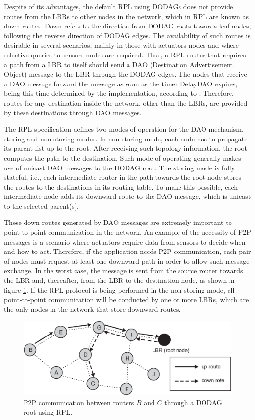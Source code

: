 \documentclass[authoryear,preprint,review,12pt]{elsarticle}
\begin{document}
Despite of its advantages, the default RPL using DODAGs does not provide routes from the LBRs to other nodes in the network, which in RPL are known as down routes. Down refers to the direction from DODAG roots towards leaf nodes, following the reverse direction of DODAG edges. The availability of such routes is desirable in several scenarios, mainly in those with actuators nodes and where selective queries to sensors nodes are required. Thus, a RPL router that requires a path from a LBR to itself should send a DAO (Destination Advertisement Object) message to the LBR through the DODAG edges. The nodes that receive a DAO message forward the message as soon as the timer DelayDAO expires, being this time determined by the implementation, according to \citep{RFC6550}. Therefore, routes for any destination inside the network, other than the LBRs, are provided by these destinations through DAO messages.

The RPL specification defines two modes of operation for the DAO mechanism, storing and non-storing modes. In non-storing mode, each node has to propagate its parent list up to the root. After receiving such topology information, the root computes the path to the destination. Such mode of operating generally makes use of unicast DAO messages to the DODAG root. The storing mode is fully stateful, i.e., each intermediate router in the path towards the root node stores the routes to the destinations in its routing table. To make this possible, each intermediate node adds its downward route to the DAO message, which is unicast to the selected parent(s).

These down routes generated by DAO messages are extremely important to point-to-point communication in the network. An example of the necessity of P2P messages is a scenario where actuators require data from sensors to decide when and how to act. Therefore, if the application needs P2P communication, each pair of nodes must request at least one downward path in order to allow such message exchange. In the worst case, the message is sent from the source router towards the LBR and, thereafter, from the LBR to the destination node, as shown in figure \ref{RPL_DAO}. If the RPL protocol is being performed in the non-storing mode, all point-to-point communication will be conducted by one or more LBRs, which are the only nodes in the network that store downward routes.

\begin{figure}[h!tb]
\centering
\includegraphics[width=1\textwidth]{figures/RPL_DAO}
\caption{P2P communication between routers $B$ and $C$ through a DODAG root using RPL.}
\label{RPL_DAO}
\end{figure}
\end{document}
